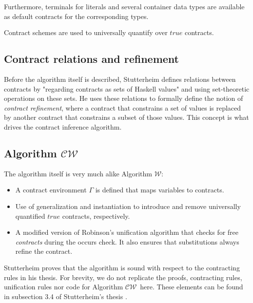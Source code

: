 \documentclass[10pt]{report}
\newcommand{\W}{$\mathcal{W}$}
\newcommand{\CW}{$\mathcal{CW}$}
\begin{document}
Furthermore, terminals for literals and several container data types are available as default contracts for the corresponding types.

Contract schemes are used to universally quantify over $true$ contracts.

\subsection{Contract relations and refinement}

Before the algorithm itself is described, Stutterheim defines relations between contracts by "regarding contracts as sets of Haskell values" and using set-theoretic operations on these sets.
He uses these relations to formally define the notion of \textit{contract refinement}, where a contract that constrains a set of values is replaced by another contract that constrains a subset of those values.
This concept is what drives the contract inference algorithm.

\subsection{Algorithm \CW}
The algorithm itself is very much alike Algorithm \W:

\begin{itemize}
	\item A contract environment $\Gamma$ is defined that maps variables to contracts.
	\item Use of generalization and instantiation to introduce and remove universally quantified $true$ contracts, respectively.
	\item A modified version of Robinson's unification algorithm that checks for free \textit{contracts} during the occurs check. It also ensures that substitutions always refine the contract.
\end{itemize}

Stutterheim proves that the algorithm is sound with respect to the contracting rules in his thesis.
For brevity, we do not replicate the proofs, contracting rules, unification rules nor code for Algorithm \CW ~here.
These elements can be found in subsection 3.4 of Stutterheim's thesis \cite{Stutterheim:2013:thesis}.
\end{document}
